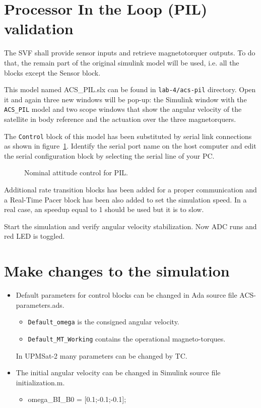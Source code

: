 \section{Processor In the Loop (PIL) validation}

The SVF shall provide sensor inputs and retrieve magnetotorquer outputs. To do that, the remain part of the original simulink model will be used, i.e. all the blocks except the Sensor block.

This model named ACS\_PIL.slx can be found in \textcolor{mPurple}{\texttt{lab-4/acs-pil}} directory. Open it and again three new windows will be pop-up: the Simulink window with the \texttt{ACS\_PIL} model
and two scope windows that show the angular velocity of the satellite in body reference and the actuation over the three magnetorquers.

The \texttt{Control} block of this model has been substituted by serial link connections as shown in figure~\ref{fig:nac-pil}. Identify the serial port name on the host computer and edit the serial configuration block by selecting the serial line of your PC.

\begin{figure}[h]
            \caption{Nominal attitude control for PIL.}
            \label{fig:nac-pil}
\end{figure}

Additional rate transition blocks has been added for a proper communication and a Real-Time Pacer block has been also added to set the simulation speed. In a real case, an speedup equal to 1 should be used but it is to slow.

Start the simulation and verify angular velocity stabilization. Now ADC runs and red LED is toggled. 

\section{Make changes to the simulation}

\begin{itemize}
\item Default parameters for control blocks can be changed in Ada source file ACS-parameters.ads.
\begin{itemize}
\item \texttt{Default\_omega} is the consigned angular velocity.
\item \texttt{Default\_MT\_Working} contains the operational magneto-torques.
\end{itemize}

In UPMSat-2 many parameters can be changed by TC.
\item The initial angular velocity can be changed in Simulink source file initialization.m.
\begin{itemize}
\item omega\_BI\_B0 = [0.1;-0.1;-0.1];
\end{itemize}
\end{itemize}
